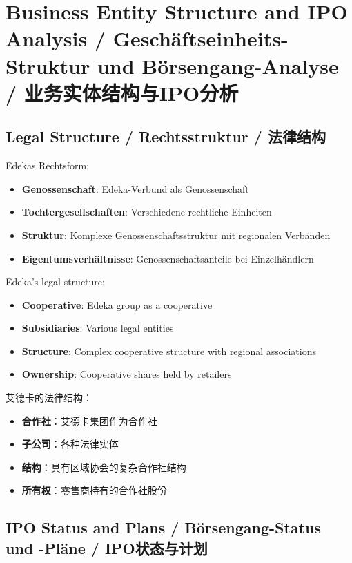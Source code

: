 \chapter{Business Entity Structure and IPO Analysis / Geschäftseinheits-Struktur und Börsengang-Analyse / 业务实体结构与IPO分析}

\section{Legal Structure / Rechtsstruktur / 法律结构}

\begin{otherlanguage}{ngerman}
Edekas Rechtsform:
\begin{itemize}
    \item \textbf{Genossenschaft}: Edeka-Verbund als Genossenschaft
    \item \textbf{Tochtergesellschaften}: Verschiedene rechtliche Einheiten
    \item \textbf{Struktur}: Komplexe Genossenschaftsstruktur mit regionalen Verbänden
    \item \textbf{Eigentumsverhältnisse}: Genossenschaftsanteile bei Einzelhändlern
\end{itemize}
\end{otherlanguage}

Edeka's legal structure:
\begin{itemize}
    \item \textbf{Cooperative}: Edeka group as a cooperative
    \item \textbf{Subsidiaries}: Various legal entities
    \item \textbf{Structure}: Complex cooperative structure with regional associations
    \item \textbf{Ownership}: Cooperative shares held by retailers
\end{itemize}

艾德卡的法律结构：
\begin{itemize}
    \item \textbf{合作社}：艾德卡集团作为合作社
    \item \textbf{子公司}：各种法律实体
    \item \textbf{结构}：具有区域协会的复杂合作社结构
    \item \textbf{所有权}：零售商持有的合作社股份
\end{itemize}

\section{IPO Status and Plans / Börsengang-Status und -Pläne / IPO状态与计划}

